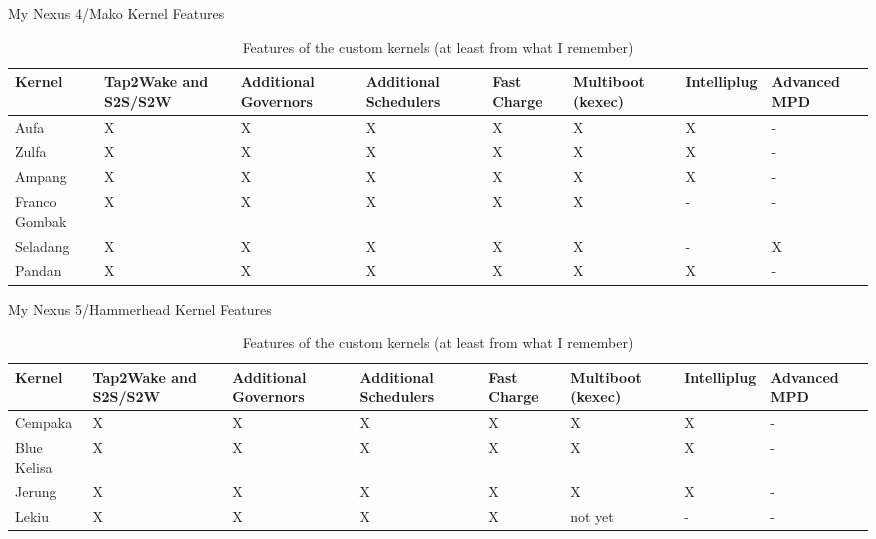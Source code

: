 \documentclass{beamer}
\begin{document}
 \begin{frame}{My Nexus 4/Mako Kernel Features}
  \tiny
 \begin{table}

 \begin{tabular} {| p{1cm}|p{1cm}|p{1cm}|p{1cm}|p{0.7cm}|p{1.25cm}|p{1cm}|p{1cm}|}
   
 \hline
  Kernel&Tap2Wake and S2S/S2W&Additional Governors&Additional Schedulers&Fast Charge&Multiboot (kexec)&Intelliplug&Advanced MPD\\
  \hline
  Aufa&X&X&X&X&X&X&- \\
  \hline
  Zulfa&X&X&X&X&X&X&-\\
  \hline
  Ampang&X&X&X&X&X&X&-\\
  \hline
  Franco Gombak&X&X&X&X&X&-&-\\
  \hline
  Seladang&X&X&X&X&X&-&X\\
  \hline
  Pandan&X&X&X&X&X&X&-\\
  \hline
  
 \end{tabular}
\caption{Features of the custom kernels (at least from what I remember)}
 \end{table}  
 \end{frame}

 \begin{frame}{My Nexus 5/Hammerhead Kernel Features}
  \tiny
 \begin{table}

 \begin{tabular} {| p{1.3cm}|p{.8cm}|p{1cm}|p{1.2cm}|p{0.7cm}|p{1.25cm}|p{1cm}|p{.8cm}|}
   
 \hline
  Kernel&Tap2Wake and S2S/S2W&Additional Governors&Additional Schedulers&Fast Charge&Multiboot (kexec)&Intelliplug&Advanced MPD\\
  \hline
  Cempaka&X&X&X&X&X&X&- \\
  \hline
  Blue Kelisa&X&X&X&X&X&X&-\\
  \hline
  Jerung&X&X&X&X&X&X&-\\
  \hline
  Lekiu&X&X&X&X&not yet&-&-\\
  \hline  
  
 \end{tabular}
\caption{Features of the custom kernels (at least from what I remember)}
 \end{table}  
 \end{frame} 
 
\end{document}
